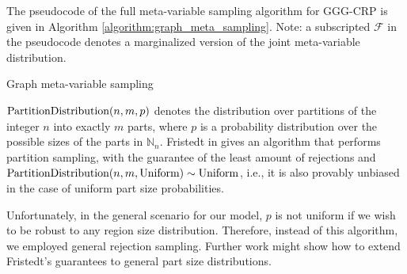 The pseudocode of the full meta-variable sampling algorithm for GGG-CRP is given in Algorithm \ref{algorithm:graph_meta_sampling}. Note: a subscripted $\mathcal{F}$ in the pseudocode denotes a marginalized version of the joint meta-variable distribution.
\begin{algorithm}[H]
\caption{Graph meta-variable sampling}
\label{algorithm:graph_meta_sampling}
\begin{algorithmic}
\ENDFOR
{}
\end{algorithmic}
\end{algorithm} 

$\text{PartitionDistribution}\mathopen{}\left(n,m,p\right)$ denotes the distribution over partitions of the integer $n$ into exactly $m$ parts, where $p$ is a probability distribution over the possible sizes of the parts in $\mathbb{N}_{n}$. Fristedt in \cite{fristedt_structure_1993} gives an algorithm that performs partition sampling, with the guarantee of the least amount of rejections and $\text{PartitionDistribution}\mathopen{}\left(n,m,\text{Uniform}\right) \sim \text{Uniform}$, i.e., it is also provably unbiased in the case of uniform part size probabilities. 

Unfortunately, in the general scenario for our model, $p$ is not uniform if we wish to be robust to any region size distribution. Therefore, instead of this algorithm, we employed general rejection sampling. Further work might show how to extend Fristedt's guarantees to general part size distributions.
    
